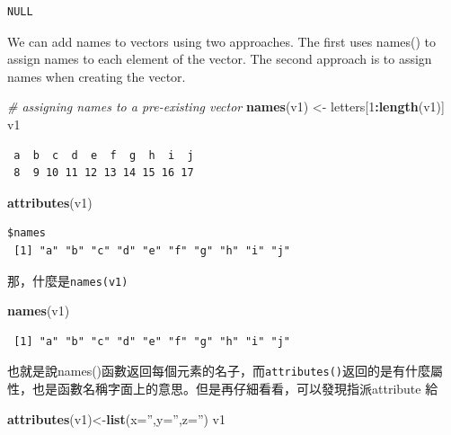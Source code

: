 \documentclass[]{book}
\newenvironment{Shaded}{\begin{snugshade}}{\end{snugshade}}
\newcommand{\CommentTok}[1]{\textcolor[rgb]{0.56,0.35,0.01}{\textit{#1}}}
\newcommand{\DataTypeTok}[1]{\textcolor[rgb]{0.13,0.29,0.53}{#1}}
\newcommand{\DecValTok}[1]{\textcolor[rgb]{0.00,0.00,0.81}{#1}}
\newcommand{\KeywordTok}[1]{\textcolor[rgb]{0.13,0.29,0.53}{\textbf{#1}}}
\newcommand{\NormalTok}[1]{#1}
\newcommand{\OperatorTok}[1]{\textcolor[rgb]{0.81,0.36,0.00}{\textbf{#1}}}
\newcommand{\StringTok}[1]{\textcolor[rgb]{0.31,0.60,0.02}{#1}}
\theoremstyle{definition}
\theoremstyle{definition}
\theoremstyle{definition}
\theoremstyle{remark}
\begin{document}
\begin{verbatim}
NULL
\end{verbatim}

We can add names to vectors using two approaches. The first uses names()
to assign names to each element of the vector. The second approach is to
assign names when creating the vector.

\begin{Shaded}
\begin{Highlighting}[]
\CommentTok{# assigning names to a pre-existing vector}
\KeywordTok{names}\NormalTok{(v1) <-}\StringTok{ }\NormalTok{letters[}\DecValTok{1}\OperatorTok{:}\KeywordTok{length}\NormalTok{(v1)]}
\NormalTok{v1}
\end{Highlighting}
\end{Shaded}

\begin{verbatim}
 a  b  c  d  e  f  g  h  i  j 
 8  9 10 11 12 13 14 15 16 17 
\end{verbatim}

\begin{Shaded}
\begin{Highlighting}[]
\KeywordTok{attributes}\NormalTok{(v1)}
\end{Highlighting}
\end{Shaded}

\begin{verbatim}
$names
 [1] "a" "b" "c" "d" "e" "f" "g" "h" "i" "j"
\end{verbatim}

那，什麼是\texttt{names(v1)}

\begin{Shaded}
\begin{Highlighting}[]
\KeywordTok{names}\NormalTok{(v1)}
\end{Highlighting}
\end{Shaded}

\begin{verbatim}
 [1] "a" "b" "c" "d" "e" "f" "g" "h" "i" "j"
\end{verbatim}

也就是說names()函數返回每個元素的名子，而\texttt{attributes()}返回的是有什麼屬性，也是函數名稱字面上的意思。但是再仔細看看，可以發現指派attribute
給

\begin{Shaded}
\begin{Highlighting}[]
\KeywordTok{attributes}\NormalTok{(v1)<-}\KeywordTok{list}\NormalTok{(}\DataTypeTok{x=}\StringTok{''}\NormalTok{,}\DataTypeTok{y=}\StringTok{''}\NormalTok{,}\DataTypeTok{z=}\StringTok{''}\NormalTok{)}
\NormalTok{v1}
\end{Highlighting}
\end{Shaded}
\end{document}
